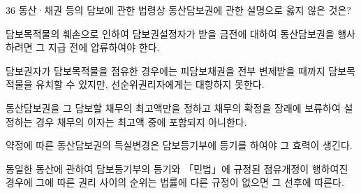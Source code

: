 \begin{question}{36}
동산·채권 등의 담보에 관한 법령상 동산담보권에 관한 설명으로 옳지 않은 것은?
\begin{choices}
  \item 담보목적물의 훼손으로 인하여 담보권설정자가 받을 금전에 대하여 동산담보권을 행사하려면 그 지급 전에 압류하여야 한다.
  \item 담보권자가 담보목적물을 점유한 경우에는 피담보채권을 전부 변제받을 때까지 담보목적물을 유치할 수 있지만, 선순위권리자에게는 대항하지 못한다.
  \item 동산담보권을 그 담보할 채무의 최고액만을 정하고 채무의 확정을 장래에 보류하여 설정하는 경우 채무의 이자는 최고액 중에 포함되지 아니한다.
  \item 약정에 따른 동산담보권의 득실변경은 담보등기부에 등기를 하여야 그 효력이 생긴다.
  \item 동일한 동산에 관하여 담보등기부의 등기와 「민법」에 규정된 점유개정이 행하여진 경우에 그에 따른 권리 사이의 순위는 법률에 다른 규정이 없으면 그 선후에 따른다.
\end{choices}
\end{question}
